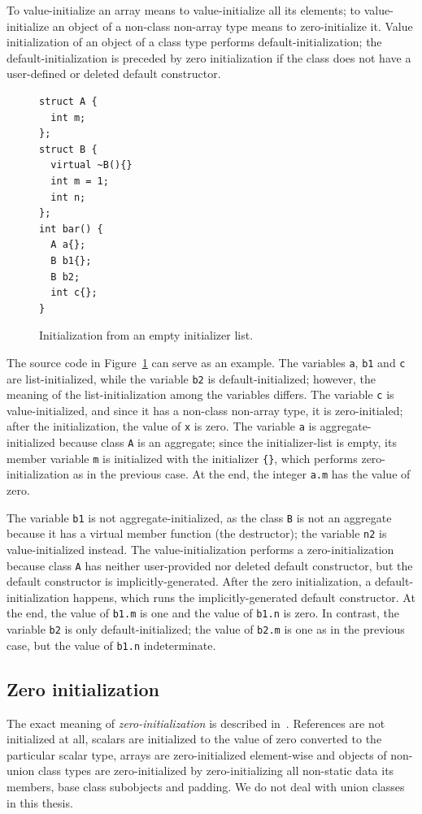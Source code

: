 \documentclass[nolot,nolof,nocover,printed]{fithesis3}
\newcommand{\stdN}[2]{\cite[#2]{#1}\xspace}
\begin{document}
To value-initialize an array means to value-initialize all its elements; to value-initialize an object of a non-class non-array type means to zero-initialize it. Value initialization of an object of a class type performs default-initialization; the default-initialization is preceded by zero initialization if the class does not have a user-defined or deleted default constructor.

\begin{figure}
\begin{lstlisting}
struct A {
  int m;
};
struct B {
  virtual ~B(){}
  int m = 1;
  int n;
};
int bar() {
  A a{};
  B b1{};
  B b2;
  int c{};
}
\end{lstlisting}
\caption{Initialization from an empty initializer list.}
\label{fig:valueInit}
\end{figure}

The source code in Figure~\ref{fig:valueInit} can serve as an example. The variables \texttt{a}, \texttt{b1} and \texttt{c} are list-initialized, while the variable \texttt{b2} is default-initialized; however, the meaning of the list-initialization among the variables differs. The variable \texttt{c} is value-initialized, and since it has a non-class non-array type, it is zero-initialed; after the initialization, the value of \lstinline|x| is zero. The variable \texttt{a} is aggregate-initialized because class \texttt{A} is an aggregate; since the initializer-list is empty, its member variable \texttt{m} is initialized with the initializer \lstinline|{}|, which performs zero-initialization as in the previous case. At the end, the integer \lstinline|a.m| has the value of zero.

The variable \texttt{b1} is not aggregate-initialized, as the class \texttt{B} is not an aggregate because it has a virtual member function (the destructor); the variable \texttt{n2} is value-initialized instead. The value-initialization performs a zero-initialization because class \texttt{A} has neither user-provided nor deleted default constructor, but the default constructor is implicitly-generated. After the zero initialization, a default-initialization happens, which runs the implicitly-generated default constructor. At the end, the value of \lstinline|b1.m| is one and the value of \lstinline|b1.n| is zero.
In contrast, the variable \texttt{b2} is only default-initialized; the value of \lstinline|b2.m| is one as in the previous case, but the value of \lstinline|b1.n| indeterminate.

\subsection{Zero initialization}
The exact meaning of \textit{zero-initialization} is described in~\stdN{n4296}{\S 8.5/6}. References are not initialized at all, scalars are initialized to the value of zero converted to the particular scalar type, arrays are zero-initialized element-wise and objects of non-union class types are zero-initialized by zero-initializing all non-static data its members, base class subobjects and padding. We do not deal with union classes in this thesis.
\end{document}
